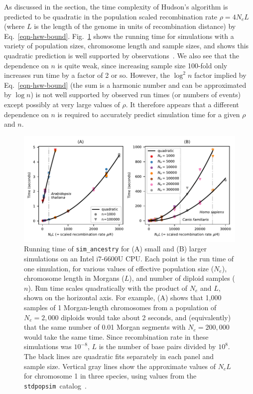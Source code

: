 \documentclass[9pt,twocolumn,twoside,lineno]{gsajnl}
\newcommand{\stdpopsim}[0]{\texttt{stdpopsim}}
\begin{document}
As discussed in the  section, the time complexity of
Hudson's algorithm is predicted to be
quadratic in the population scaled recombination rate
$\rho = 4 N_e L$ (where $L$ is the length of the genome in units of
recombination distance) by Eq.~\eqref{eqn-hsw-bound}.
Fig.~\ref{fig-ancestry-perf} shows the running time for
simulations with a variety of population sizes, chromosome
length and sample sizes, and shows this quadratic
prediction is well supported by
observations~\citep[see also][Fig.~2]{kelleher2016efficient}.
We also see that the dependence on $n$ is quite weak,
since increasing sample size 100-fold
only increases run time by a factor of 2 or so. However, the
$\log^2{n}$ factor implied by Eq.~\eqref{eqn-hsw-bound}
(the sum is a harmonic number and can be approximated by $\log{n}$)
is not well supported by observed run times (or numbers of events)
except possibly at very
large values of $\rho$. It therefore appears that a different dependence
on $n$ is required to accurately predict simulation time for a
given $\rho$ and $n$.

\begin{figure}
\begin{center}
    \includegraphics{figures/ancestry-perf}
\end{center}
\caption{\label{fig-ancestry-perf}
    Running time of \texttt{sim\_ancestry}
    for (A) small and (B) larger simulations on an Intel i7-6600U CPU.
    Each point is the run time of one simulation,
    for various values of effective population size ($N_e$),
    chromosome length in Morgans ($L$), and number of diploid samples ($n$).
    Run time scales quadratically with the product of $N_e$ and $L$,
    shown on the horizontal axis. For example, (A) shows that
    1,000 samples of 1 Morgan-length chromosomes
    from a population of $N_e=2,000$ diploids
    would take about 2 seconds, and (equivalently) that the same number of
    0.01 Morgan segments with $N_e=200,000$ would take the same time.
    Since recombination rate in these simulations was $10^{-8}$,
    $L$ is the number of base pairs divided by $10^8$.
    The black lines are quadratic fits separately in each panel
    and sample size. Vertical gray lines show the approximate values of
    $N_e L$ for chromosome 1 in three species, using values from
    the \stdpopsim\ catalog~\citep{adrion2020community}.
}
\end{figure}
\end{document}
